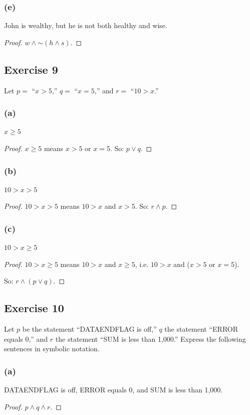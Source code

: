 \documentclass[14pt]{extarticle}
\begin{document}
\subsubsection{(e)} John is wealthy, but he is not both healthy and wise.
\begin{proof} $w \wedge {\sim (h \wedge s)}$. \end{proof}
\subsection{Exercise 9} Let $p =$ “$x > 5$,” $q =$ “$x = 5$,” and $r =$ “$10 >
x$.”

\subsubsection{(a)} $x \geq 5$
\begin{proof} $x \geq 5$ means $x > 5$ or $x = 5$. So: $p \vee q$. \end{proof}
\subsubsection{(b)} $10 > x > 5$
\begin{proof} $10 > x > 5$ means $10 > x$ and $x > 5$. So: $r \wedge p$.
\end{proof}

\subsubsection{(c)} $10 > x \geq 5$
\begin{proof} $10 > x \geq 5$ means $10 > x$ and $x \geq 5$, i.e. $10 > x$ and
($x > 5$ or $x = 5$).

So: $r \wedge (p \vee q)$. \end{proof}
\subsection{Exercise 10} Let $p$ be the statement “DATAENDFLAG is off,” $q$ the
statement “ERROR equals 0,” and $r$ the statement “SUM is less than 1,000.”
Express the following sentences in symbolic notation.

\subsubsection{(a)} DATAENDFLAG is off, ERROR equals 0, and SUM is less than
1,000.

\begin{proof} $p \wedge q \wedge r$. \end{proof}
\end{document}
